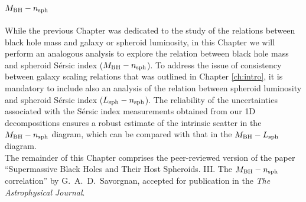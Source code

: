 \chapter{$M_{\rm BH} - n_{\rm sph}$}
\label{ch:mn}

While the previous Chapter was dedicated to the study of the relations between 
black hole mass and galaxy or spheroid luminosity, 
in this Chapter we will perform an analogous analysis 
to explore the relation between black hole mass and spheroid S\'ersic index ($M_{\rm BH} - n_{\rm sph}$). 
To address the issue of consistency between galaxy scaling relations 
that was outlined in Chapter \ref{ch:intro}, 
it is mandatory to include also an analysis of the relation between spheroid luminosity 
and spheroid S\'ersic index ($L_{\rm sph} - n_{\rm sph}$). 
The reliability of the uncertainties associated with the S\'ersic index measurements 
obtained from our 1D decompositions 
ensures a robust estimate of the intrinsic scatter in the $M_{\rm BH} - n_{\rm sph}$ diagram, 
which can be compared with that in the $M_{\rm BH} - L_{\rm sph}$ diagram. \\

The remainder of this Chapter comprises the peer-reviewed version of the paper 
``Supermassive Black Holes and Their Host Spheroids. 
III. The $M_{\rm BH} - n_{\rm sph}$ correlation'' 
by G.~A.~D.~Savorgnan,  
accepted for publication in the \emph{The Astrophysical Journal}. 




